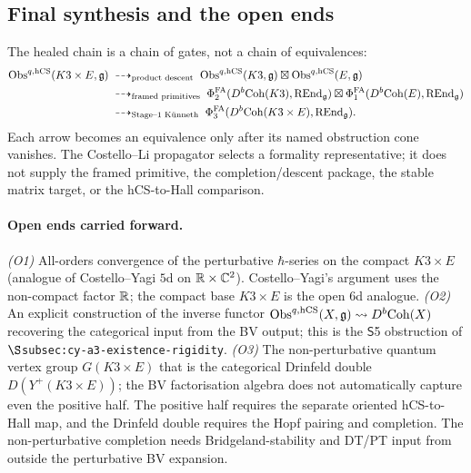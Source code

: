\subsection*{Final synthesis and the open ends}
\label{sec:agent06-synthesis}

The healed chain is a chain of gates, not a chain of equivalences:
\begin{align*}
\mathrm{Obs}^{q,\mathrm{hCS}}(K3 \times E,\mathfrak g)
\;&\dashrightarrow_{\text{product descent}}\;
\mathrm{Obs}^{q,\mathrm{hCS}}(K3,\mathfrak g) \boxtimes \mathrm{Obs}^{q,\mathrm{hCS}}(E,\mathfrak g) \\
\;&\dashrightarrow_{\text{framed primitives}}\;
\Phi^{\mathrm{FA}}_2(D^b\mathrm{Coh}(K3),\mathrm{REnd}_\mathfrak g) \boxtimes
\Phi^{\mathrm{FA}}_1(D^b\mathrm{Coh}(E),\mathrm{REnd}_\mathfrak g) \\
\;&\dashrightarrow_{\text{Stage--$1$ K\"unneth}}\;
\Phi^{\mathrm{FA}}_3(D^b\mathrm{Coh}(K3 \times E),\mathrm{REnd}_\mathfrak g).
\end{align*}
Each arrow becomes an equivalence only after its named obstruction
cone vanishes. The Costello--Li propagator selects a formality
representative; it does not supply the framed primitive, the
completion/descent package, the stable matrix target, or the
hCS-to-Hall comparison.

\paragraph{Open ends carried forward.}
\textit{(O1)} All-orders convergence of the perturbative $\hbar$-series
on the compact $K3 \times E$ (analogue of Costello--Yagi $5$d on
$\mathbb R \times \mathbb C^2$). Costello--Yagi's argument uses the
non-compact factor $\mathbb R$; the compact base $K3 \times E$ is the open
$6$d analogue.
\textit{(O2)} An explicit construction of the inverse functor
$\mathrm{Obs}^{q,\mathrm{hCS}}(X, \mathfrak g) \rightsquigarrow D^b\mathrm{Coh}(X)$ recovering
the categorical input from the BV output; this is the $\mathsf{S}$5
obstruction of $\S$\texttt{subsec:cy-a3-existence-rigidity}.
\textit{(O3)} The non-perturbative quantum vertex group
$G(K3 \times E)$ that is the categorical Drinfeld double $D(Y^+(K3
\times E))$; the BV factorisation algebra does not automatically
capture even the positive half. The positive half requires the separate
oriented hCS-to-Hall map, and the Drinfeld double requires the Hopf
pairing and completion. The non-perturbative completion
needs Bridgeland-stability and DT/PT input from outside the
perturbative BV expansion.

